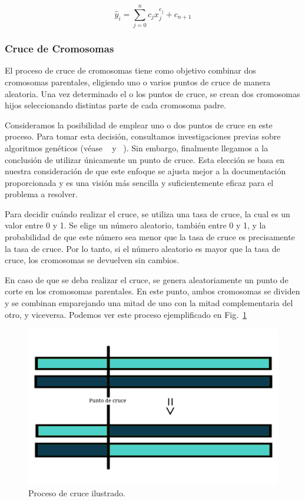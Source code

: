 \documentclass[conference,a4paper]{IEEEtran}
\def\figurename{Fig.}
\begin{document}
\[
\hat{y}_i = \sum_{j=0}^{n} c_j x_j^{e_j} + c_{n+1}
\]


\subsubsection{Cruce de Cromosomas}
El proceso de cruce de cromosomas tiene como objetivo combinar dos cromosomas parentales, eligiendo uno o varios puntos de cruce de manera aleatoria. Una vez determinado el o los puntos de cruce, se crean dos cromosomas hijos seleccionando distintas parte de cada cromosoma padre. 

Consideramos la posibilidad de emplear uno o dos puntos de cruce en este proceso. Para tomar esta decisión, consultamos investigaciones previas sobre algoritmos genéticos (véase ~\cite{b1} y ~\cite{b2}). Sin embargo, finalmente llegamos a la conclusión de utilizar únicamente un punto de cruce. Esta elección se basa en nuestra consideración de que este enfoque se ajusta mejor a la documentación proporcionada y es una visión más sencilla y suficientemente eficaz para el problema a resolver.

Para decidir cuándo realizar el cruce, se utiliza una tasa de cruce, la cual es un valor entre 0 y 1. Se elige un número aleatorio, también entre 0 y 1, y la probabilidad de que este número sea menor que la tasa de cruce es precisamente la tasa de cruce. Por lo tanto, si el número aleatorio es mayor que la tasa de cruce, los cromosomas se devuelven sin cambios. 

En caso de que se deba realizar el cruce, se genera aleatoriamente un punto de corte en los cromosomas parentales. En este punto, ambos cromosomas se dividen y se combinan emparejando una mitad de uno con la mitad complementaria del otro, y viceversa. Podemos ver este proceso ejemplificado en \figurename~\ref{fig:chromosome-crossover}


\begin{figure}[H]
    \centering
    \includegraphics[width=\columnwidth]{image-chromosome-crossover.jpg}
    \caption{Proceso de cruce ilustrado.}
    \label{fig:chromosome-crossover}
\end{figure}
\end{document}
